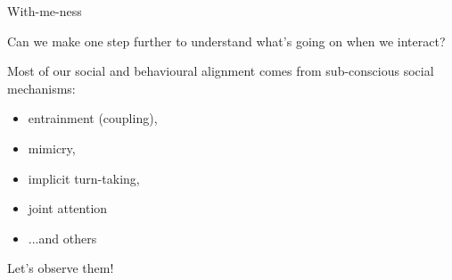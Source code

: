 \documentclass[compress]{beamer}
\begin{document}



{

\begin{frame}{With-me-ness}
\end{frame}
}


%
%
%
%


 \begin{frame}[plain]{}

     {
     \centering
     \Large\bf

     Can we make one step further to understand what's going on when we
     interact?
     }

     \pause


    Most of our social and behavioural alignment comes from sub-conscious social
    mechanisms:

    \begin{itemize}
        \item entrainment (coupling), 
        \item mimicry, 
        \item implicit turn-taking,
        \item joint attention
        \item ...and others
    \end{itemize}
    \pause
    \begin{center}
        Let's observe them!
    \end{center}
\end{frame}
\end{document}
